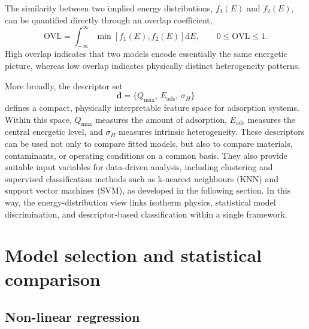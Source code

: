 \documentclass[journal=jacsat,manuscript=article]{achemso}
\begin{document}
	The similarity between two implied energy distributions, $f_1(E)$ and $f_2(E)$, can be quantified directly through an overlap coefficient,
	\begin{equation}
		\mathrm{OVL}
		=
		\int_{-\infty}^{\infty}
		\min\!\left[f_1(E),f_2(E)\right]\mathrm{d}E,
		\qquad
		0 \leq \mathrm{OVL} \leq 1.
		\label{eq:ovl_main}
	\end{equation}
	High overlap indicates that two models encode essentially the same energetic picture, whereas low overlap indicates physically distinct heterogeneity patterns. %
	
	More broadly, the descriptor set
	\begin{equation}
		\mathbf{d} = \{Q_{\max},\, E_{\mathrm{ads}},\, \sigma_H\}
		\label{eq:descriptor_bridge}
	\end{equation}
	defines a compact, physically interpretable feature space for adsorption systems. Within this space, $Q_{\max}$ measures the amount of adsorption, $E_{\mathrm{ads}}$ measures the central energetic level, and $\sigma_H$ measures intrinsic heterogeneity. These descriptors can be used not only to compare fitted models, but also to compare materials, contaminants, or operating conditions on a common basis. They also provide suitable input variables for data-driven analysis, including clustering and supervised classification methods such as k-nearest neighbours (KNN) and support vector machines (SVM), as developed in the following section. In this way, the energy-distribution view links isotherm physics, statistical model discrimination, and descriptor-based classification within a single framework.
	\section{Model selection and statistical comparison}
	\label{sec:model_selection}

	\subsection{Non-linear regression}
	\label{sec:fitting}
\end{document}
